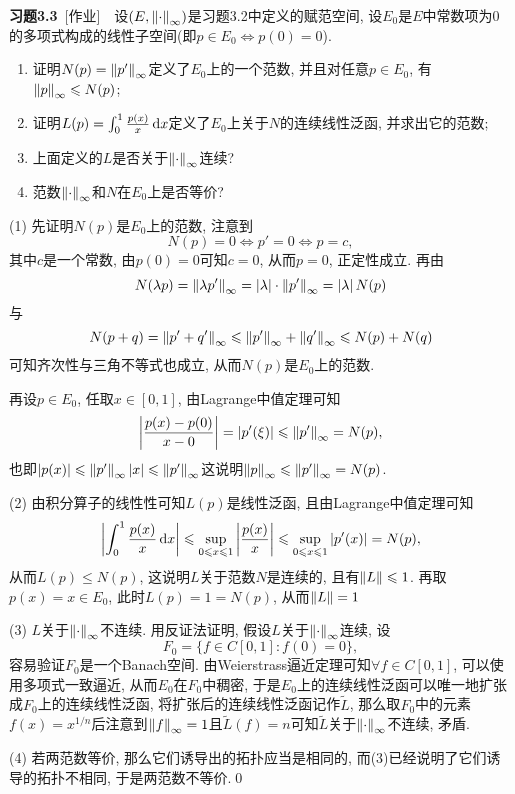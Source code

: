 	\textbf{习题3.3}\ [作业]\ \ 设$ (E,\left\| \cdot \right\|_\infty) $是习题3.2中定义的赋范空间, 设$ E_0 $是$ E $中常数项为0的多项式构成的线性子空间(即$ p\in E_0\Longleftrightarrow p(0)=0 $).
	\begin{enumerate}[(1)]
	\item 证明$ N(p)=\left\| p' \right\|_\infty $定义了$ E_0 $上的一个范数, 并且对任意$ p\in E_0 $, 有$ \left\| p \right\|_\infty\leqslant N(p) $;
	\item 证明$ L(p)=\int_0^1\frac{p(x)}{x}\,\mathrm{d} x $定义了$ E_0 $上关于$ N $的连续线性泛函, 并求出它的范数;
	\item 上面定义的$ L $是否关于$ \left\| \cdot \right\|_\infty $连续?
	\item 范数$ \left\| \cdot \right\|_\infty $和$ N $在$ E_0 $上是否等价?
	\end{enumerate}
	\begin{Proof}
	(1) 先证明$ N(p) $是$ E_0 $上的范数, 注意到
	\[
	N(p)=0\Longleftrightarrow p'=0\Longleftrightarrow p=c,
	\]
	其中$ c $是一个常数, 由$ p(0)=0 $可知$ c=0 $, 从而$ p=0 $, 正定性成立. 再由
	\[
	N(\lambda p)=\left\| \lambda p' \right\|_\infty=\left| \lambda \right| \cdot\left\| p' \right\|_\infty=\left| \lambda \right| N(p)
	\]
	与
	\[
	N(p+q)=\left\| p'+q' \right\|_\infty\leqslant\left\| p' \right\|_\infty+\left\| q' \right\|_\infty\leqslant N(p)+N(q)
	\]
	可知齐次性与三角不等式也成立, 从而$ N(p) $是$ E_0 $上的范数.
	
	再设$ p\in E_0 $, 任取$ x\in[0,1] $, 由Lagrange中值定理可知
	\[
	\left| \frac{p(x)-p(0)}{x-0} \right| =\left| p'(\xi) \right| \leqslant\left\| p' \right\|_\infty=N(p),
	\]
	也即$ \left| p(x) \right| \leqslant \left\| p' \right\|_\infty\left| x \right| \leqslant \left\| p' \right\|_\infty $这说明$ \left\| p \right\|_\infty\leqslant\left\| p' \right\|_\infty=N(p) $.
	
	(2) 由积分算子的线性性可知$ L(p) $是线性泛函, 且由Lagrange中值定理可知
	\[
	\left| \int_0^1\frac{p(x)}{x}\,\mathrm{d} x \right| \leqslant\sup_{0\leqslant x\leqslant 1}\left| \frac{p(x)}{x} \right| \leqslant\sup_{0\leqslant x\leqslant 1}\left| p'(x) \right| =N(p),
	\]
	从而$ L(p)\leqslant N(p) $, 这说明$ L $关于范数$ N $是连续的, 且有$ \left\| L \right\|\leqslant 1 $. 再取$ p(x)=x\in E_0 $, 此时$ L(p)=1=N(p) $, 从而$ \left\| L \right\|=1 $
	
	(3) $ L $关于$ \left\| \cdot \right\|_\infty $不连续. 用反证法证明, 假设$ L $关于$ \left\| \cdot \right\|_\infty $连续, 设
	\[
	 F_0=\{ f\in C[0,1] : f(0)=0 \},
	\]
	容易验证$ F_0 $是一个Banach空间. 由Weierstrass逼近定理可知$ \forall f\in C[0,1] $, 可以使用多项式一致逼近, 从而$ E_0 $在$ F_0 $中稠密, 于是$ E_0 $上的连续线性泛函可以唯一地扩张成$ F_0 $上的连续线性泛函, 将扩张后的连续线性泛函记作$ \tilde{L} $, 那么取$ F_0 $中的元素$ f(x)=x^{1/n} $后注意到$ \left\| f \right\|_\infty=1 $且$ \tilde{L}(f)=n $可知$ \tilde{L} $关于$ \left\| \cdot \right\|_\infty $不连续, 矛盾.
	
	(4) 若两范数等价, 那么它们诱导出的拓扑应当是相同的, 而(3)已经说明了它们诱导的拓扑不相同, 于是两范数不等价.\qed
	\end{Proof}
	

